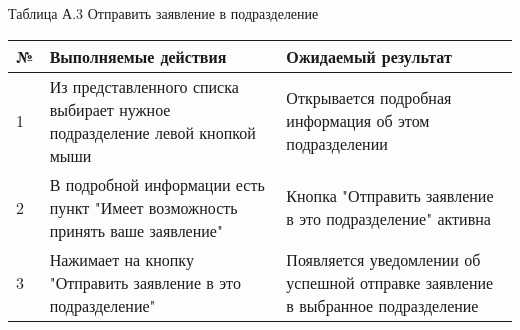\documentclass[russian, utf8, 12pt,pointsubsection,floatsubsection]{eskdtext}
\begin{document}
Таблица А.3 Отправить заявление в подразделение\\
\begin{tabular}{| l |  p{8cm} | p{8cm} |}
\hline 
№  &  Выполняемые действия & Ожидаемый результат\\
\hline \hline
1  & Из представленного списка выбирает нужное подразделение левой кнопкой мыши & Открывается подробная информация об этом подразделении \\
\hline
2  & В подробной информации есть пункт "Имеет возможность принять ваше заявление" & Кнопка "Отправить заявление в это подразделение" активна \\
\hline
3  & Нажимает на кнопку "Отправить заявление в это подразделение" & Появляется уведомлении об успешной отправке заявление в выбранное подразделение \\
\hline
\end{tabular}
\end{document}
